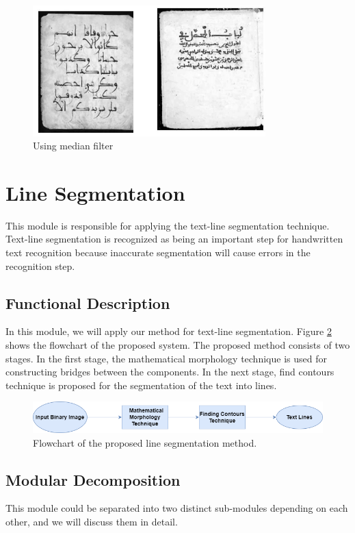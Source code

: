 \begin{itemize}[labelindent=1em,labelsep=0.25cm,leftmargin=*]
        \begin{figure}[!htb]
            \centering
            \includegraphics[width=9cm]{images/afmedian.png}
            \caption{Using median filter}
            \label{fig:afmed}
        \end{figure}
    \end{itemize}

\section{Line Segmentation}
This module is responsible for applying the text-line segmentation technique. Text-line segmentation is recognized as being an important step for handwritten text recognition because inaccurate segmentation will cause errors in the recognition step. %

\subsection{Functional Description}
In this module, we will apply our method for text-line segmentation. Figure \ref{fig:flow_line} shows the flowchart of the proposed system. The proposed method consists of two stages. In the first stage, the mathematical morphology technique is used for constructing bridges between the components. In the next stage, find contours technique is proposed for the segmentation of the text into lines.
        \begin{figure}[!htb]
            \centering
            \includegraphics[width=14cm]{images/flowchart_line_segmentation.png}
            \caption{Flowchart of the proposed line segmentation method. }
            \label{fig:flow_line}
        \end{figure}
\subsection{Modular Decomposition}
This module could be separated into two distinct sub-modules depending on each other, and we will discuss them in detail. %

